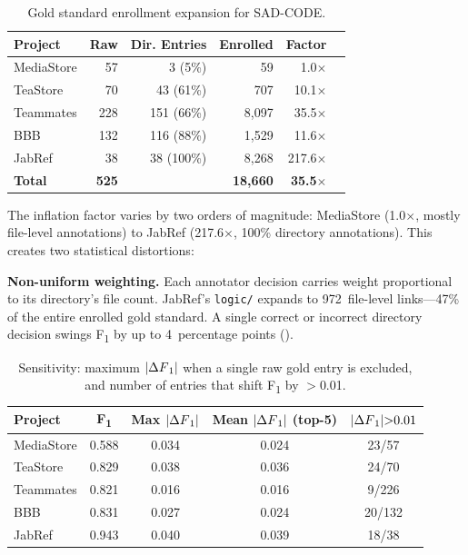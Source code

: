 \documentclass[11pt,a4paper]{report}
\newcommand{\sadcode}{SAD-CODE\xspace}
\newcommand{\fone}{F\textsubscript{1}\xspace}
\begin{document}
\begin{table}[h]
\caption{Gold standard enrollment expansion for \sadcode.}
\label{tab:enrollment}
\centering\small
\begin{tabular}{lrrrrr}
\toprule
\textbf{Project} & \textbf{Raw} & \textbf{Dir. Entries} & \textbf{Enrolled} & \textbf{Factor} \\
\midrule
MediaStore       & 57   & 3 (5\%)    & 59    & 1.0$\times$ \\
TeaStore         & 70   & 43 (61\%)  & 707   & 10.1$\times$ \\
Teammates        & 228  & 151 (66\%) & 8,097 & 35.5$\times$ \\
BBB              & 132  & 116 (88\%) & 1,529 & 11.6$\times$ \\
JabRef           & 38   & 38 (100\%) & 8,268 & 217.6$\times$ \\
\midrule
\textbf{Total}   & \textbf{525} &  & \textbf{18,660} & \textbf{35.5$\times$} \\
\bottomrule
\end{tabular}
\end{table}

The inflation factor varies by two orders of magnitude: MediaStore (1.0$\times$,
mostly file-level annotations) to JabRef (217.6$\times$, 100\% directory
annotations). This creates two statistical distortions:

\textbf{Non-uniform weighting.} Each annotator decision carries weight
proportional to its directory's file count. JabRef's \texttt{logic/} expands to
972~file-level links---47\% of the entire enrolled gold standard. A single
correct or incorrect directory decision swings \fone by up to 4~percentage
points ().

\begin{table}[h]
\caption{Sensitivity: maximum $|\Delta\fone|$ when a single raw gold entry is
excluded, and number of entries that shift \fone by $>$0.01.}
\label{tab:sensitivity}
\centering\small
\begin{tabular}{lcccc}
\toprule
\textbf{Project} & \textbf{\fone} & \textbf{Max $|\Delta\fone|$} &
\textbf{Mean $|\Delta\fone|$ (top-5)} & \textbf{$|\Delta\fone|{>}0.01$} \\
\midrule
MediaStore  & 0.588 & 0.034 & 0.024 & 23/57 \\
TeaStore    & 0.829 & 0.038 & 0.036 & 24/70 \\
Teammates   & 0.821 & 0.016 & 0.016 & 9/226 \\
BBB         & 0.831 & 0.027 & 0.024 & 20/132 \\
JabRef      & 0.943 & 0.040 & 0.039 & 18/38 \\
\bottomrule
\end{tabular}
\end{table}
\end{document}
